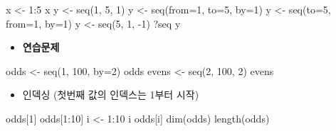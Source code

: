 \documentclass[
]{book}
\newenvironment{Shaded}{\begin{snugshade}}{\end{snugshade}}
\newcommand{\AttributeTok}[1]{\textcolor[rgb]{0.77,0.63,0.00}{#1}}
\newcommand{\DecValTok}[1]{\textcolor[rgb]{0.00,0.00,0.81}{#1}}
\newcommand{\FunctionTok}[1]{\textcolor[rgb]{0.00,0.00,0.00}{#1}}
\newcommand{\NormalTok}[1]{#1}
\newcommand{\OtherTok}[1]{\textcolor[rgb]{0.56,0.35,0.01}{#1}}
\newcommand{\SpecialCharTok}[1]{\textcolor[rgb]{0.00,0.00,0.00}{#1}}
\providecommand{\tightlist}{%
  \setlength{\itemsep}{0pt}\setlength{\parskip}{0pt}}
\begin{document}
\begin{Shaded}
\begin{Highlighting}[]
\NormalTok{x }\OtherTok{\textless{}{-}} \DecValTok{1}\SpecialCharTok{:}\DecValTok{5}
\NormalTok{x}
\NormalTok{y }\OtherTok{\textless{}{-}} \FunctionTok{seq}\NormalTok{(}\DecValTok{1}\NormalTok{, }\DecValTok{5}\NormalTok{, }\DecValTok{1}\NormalTok{)}
\NormalTok{y }\OtherTok{\textless{}{-}} \FunctionTok{seq}\NormalTok{(}\AttributeTok{from=}\DecValTok{1}\NormalTok{, }\AttributeTok{to=}\DecValTok{5}\NormalTok{, }\AttributeTok{by=}\DecValTok{1}\NormalTok{)}
\NormalTok{y }\OtherTok{\textless{}{-}} \FunctionTok{seq}\NormalTok{(}\AttributeTok{to=}\DecValTok{5}\NormalTok{, }\AttributeTok{from=}\DecValTok{1}\NormalTok{, }\AttributeTok{by=}\DecValTok{1}\NormalTok{)}
\NormalTok{y }\OtherTok{\textless{}{-}} \FunctionTok{seq}\NormalTok{(}\DecValTok{5}\NormalTok{, }\DecValTok{1}\NormalTok{, }\SpecialCharTok{{-}}\DecValTok{1}\NormalTok{)}
\NormalTok{?seq}
\NormalTok{y}
\end{Highlighting}
\end{Shaded}

\begin{itemize}
\tightlist
\item
  \textbf{연습문제}
\end{itemize}

\begin{Shaded}
\begin{Highlighting}[]
\NormalTok{odds }\OtherTok{\textless{}{-}} \FunctionTok{seq}\NormalTok{(}\DecValTok{1}\NormalTok{, }\DecValTok{100}\NormalTok{, }\AttributeTok{by=}\DecValTok{2}\NormalTok{)}
\NormalTok{odds  }
\NormalTok{evens }\OtherTok{\textless{}{-}} \FunctionTok{seq}\NormalTok{(}\DecValTok{2}\NormalTok{, }\DecValTok{100}\NormalTok{, }\DecValTok{2}\NormalTok{)}
\NormalTok{evens}
\end{Highlighting}
\end{Shaded}

\begin{itemize}
\tightlist
\item
  인덱싱 (첫번째 값의 인덱스는 1부터 시작)
\end{itemize}

\begin{Shaded}
\begin{Highlighting}[]

\NormalTok{odds[}\DecValTok{1}\NormalTok{]}
\NormalTok{odds[}\DecValTok{1}\SpecialCharTok{:}\DecValTok{10}\NormalTok{]}
\NormalTok{i }\OtherTok{\textless{}{-}} \DecValTok{1}\SpecialCharTok{:}\DecValTok{10}
\NormalTok{i}
\NormalTok{odds[i]}
\FunctionTok{dim}\NormalTok{(odds)}
\FunctionTok{length}\NormalTok{(odds)}
\end{Highlighting}
\end{Shaded}
\end{document}
